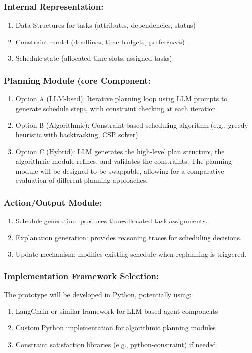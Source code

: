\documentclass[12pt]{article}
\begin{document}
\subsubsection{Internal Representation:}
\begin{enumerate}
    \item Data Structures for tasks (attributes, dependencies, status)
    \item Constraint model (deadlines, time budgets, preferences).
    \item Schedule state (allocated time slots, assigned tasks).
\end{enumerate}

\subsubsection{Planning Module (core Component:}
\begin{enumerate}
    \item Option A (LLM-bsed): Iterative planning loop using LLM prompts to generate schedule steps, with constraint checking at each iteration.
    \item Option B (Algorithmic): Constraint-based scheduling algorithm (e.g., greedy heuristic with backtracking, CSP solver).
    \item Option C (Hybrid): LLM generates the high-level plan structure, the algorithmic module refines, and validates the constraints.
The planning module will be designed to be swappable, allowing for a comparative evaluation of different planning approaches.
\end{enumerate}
\subsubsection{Action/Output Module:}
\begin{enumerate}
    \item Schedule generation: produces time-allocated task assignments.
    \item Explanation generation: provides reasoning traces for scheduling decisions.
    \item Update mechanism: modifies existing schedule when replanning is triggered.
\end{enumerate}
\subsubsection{Implementation Framework Selection:}
The prototype will be developed in Python, potentially using:
\begin{enumerate}
    \item LangChain or similar framework for LLM-based agent components
    \item Custom Python implementation for algorithmic planning modules
    \item Constraint satisfaction libraries (e.g., python-constraint) if needed
\end{enumerate}
\end{document}
